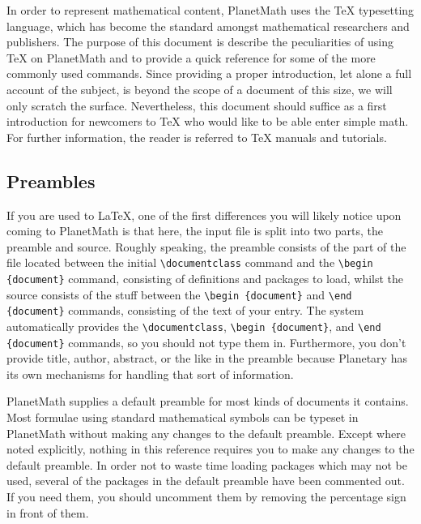 In order to represent mathematical content, PlanetMath uses the \TeX{} typesetting language, which has become the standard amongst mathematical researchers and publishers.  The purpose of this document is describe the peculiarities of using \TeX{} on PlanetMath and to provide a quick reference for some of the more commonly used commands.   Since providing a proper introduction, let alone a full account of the subject, is beyond the scope of a document of this size, we will only scratch the surface.  Nevertheless, this document should suffice as a first introduction for newcomers to \TeX{} who would like to be able enter simple math.  For further information, the reader is referred to \TeX{} manuals and tutorials.

\subsection{Preambles}

If you are used to \LaTeX{}, one of the first differences you will likely notice upon coming to PlanetMath is that here, the input file is split into two parts, the preamble and source.  Roughly speaking, the preamble consists of the part of the file located between the initial \texttt{\textbackslash documentclass} command and the \texttt{\textbackslash begin \{document\}} command, consisting of definitions and packages to load, whilst the source consists of the stuff between the \texttt{\textbackslash begin \{document\}} and \texttt{\textbackslash end \{document\}} commands, consisting of the text of your entry.  The system automatically provides the  \texttt{\textbackslash documentclass}, \texttt{\textbackslash begin \{document\}}, and \texttt{\textbackslash end \{document\}} commands, so you should not type them in.  Furthermore, you don't provide title, author, abstract, or the like in the preamble because Planetary has its own mechanisms for handling that sort of information.

PlanetMath supplies a default preamble for most kinds of documents it contains. Most formulae using standard mathematical symbols can be typeset in PlanetMath without making any changes to the default preamble.  Except where noted explicitly, nothing in this reference requires you to make any changes to the default preamble.  In order not to waste time loading packages which may not be used, several of the packages in the default preamble have been commented out.  If you need them, you should uncomment them by removing the percentage sign in front of them.

